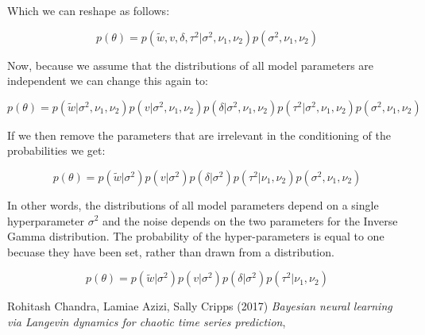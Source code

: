\documentclass[12pt,a4paper]{article}
\numberwithin{equation}{section}
\begin{document}
Which we can reshape as follows:

\begin{equation}
p(\theta) = p(\tilde{w}, v, \delta, \tau^2 | \sigma^2, \nu_1, \nu_2) p(\sigma^2, \nu_1, \nu_2)
\end{equation}

Now, because we assume that the distributions of all model parameters are independent we can 
change this again to:

\begin{equation}
p(\theta) = p(\tilde{w}|\sigma^2, \nu_1, \nu_2) p(v|\sigma^2, \nu_1, \nu_2) p(\delta|\sigma^2, \nu_1, \nu_2) p(\tau^2 | \sigma^2, \nu_1, \nu_2) p(\sigma^2, \nu_1, \nu_2)
\end{equation}

If we then remove the parameters that are irrelevant in the conditioning of the probabilities we get:

\begin{equation}
p(\theta) = p(\tilde{w}|\sigma^2) p(v|\sigma^2) p(\delta|\sigma^2) p(\tau^2|\nu_1, \nu_2) p(\sigma^2, \nu_1, \nu_2)
\end{equation}

In other words, the distributions of all model parameters depend on a single hyperparameter $\sigma^2$ and the 
noise depends on the two parameters for the Inverse Gamma distribution. 
The probability of the hyper-parameters is
equal to one becuase they have been set, rather than drawn from a distribution.

\begin{equation}
p(\theta) = p(\tilde{w}|\sigma^2) p(v|\sigma^2) p(\delta|\sigma^2) p(\tau^2|\nu_1, \nu_2) 
\end{equation}



\begin{thebibliography}{99}

 Rohitash Chandra, Lamiae Azizi, Sally Cripps (2017) \textit{Bayesian neural learning via Langevin dynamics for chaotic time series prediction}, \begin{verbatim} \end{verbatim}

\end{thebibliography}
\end{document}

